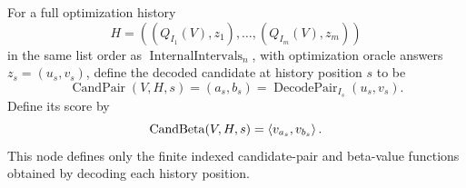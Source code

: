 \begin{definition}
  \label{def:minip-split-history-decoded-candidates}
  For a full optimization history
  \[
    H=((Q_{I_1}(V),z_1),\ldots,(Q_{I_m}(V),z_m))
  \]
  in the same list order as $\operatorname{InternalIntervals}_n$, with
  optimization oracle answers $z_s=(u_s,v_s)$, define the decoded candidate at
  history position $s$ to be
  \[
    \operatorname{CandPair}(V,H,s)
      =
    (a_s,b_s)=\operatorname{DecodePair}_{I_s}(u_s,v_s).
  \]
  Define its score by
  \[
    \operatorname{CandBeta}(V,H,s)=\left\langle v_{a_s},v_{b_s}\right\rangle.
  \]
  This node defines only the finite indexed candidate-pair and beta-value
  functions obtained by decoding each history position.
\end{definition}

